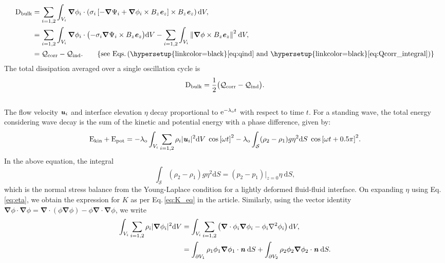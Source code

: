 \documentclass[aps,prfluids,reprint,superscriptaddress]{revtex4-2}
\newcommand{\h}[1]{\textbf{\textit{#1}}}
\newcommand{\ii}[1]{\text{#1}}
\newcommand{\nn}{\nonumber}
\newcommand{\mref}[1]{{\hypersetup{linkcolor=black}\ref{#1}}}
\newcommand{\meqref}[1]{{\hypersetup{linkcolor=black}\eqref{#1}}}
\numberwithin{equation}{section}
\begin{document}
\begin{align}
	\nn
	\ii D_{\rm bulk} &= \sum_{i=1,2} \int_{V_i} 
	\bm\nabla\phi_i \cdot 
	\left( \sigma_i\left[ -\bm\nabla\Psi_i + \bm\nabla\phi_i \times B_z\h e_z \right]
	\times B_z\h e_z \right) \mathrm dV,
	\\
	\nn
	&= \sum_{i=1,2} \int_{V_i}  \bm\nabla\phi_i \cdot \bigl(
	-\sigma_i\bm\nabla\Psi_i \times B_z\h e_z \bigr) \mathrm dV
	- 
	\sum_{i=1,2} \int_{V_i} \norm{\bm\nabla\phi \times B_z\h e_z}^2 \: \mathrm dV,
	\\
	& = \mathcal{Q}_{\rm corr} - \mathcal{Q}_{\rm ind}. 
	\qquad \{ \ii{see Eqs.\,(\mref{eq:qind} and \mref{eq:Qcorr_integral})} \}
	\label{eq:Dbulk_result}
\end{align}
The total dissipation averaged over a single oscillation cycle is
\begin{equation}
	\ii D_{\rm bulk} = \frac{1}{2} \bigl(\mathcal{Q}_{\rm corr} - \mathcal{Q}_{\rm ind} \bigr).
	\label{eq:Dbulk_avg}
\end{equation}
\\
\indent The flow velocity $\h u_i$ and interface elevation $\eta$ decay proportional to $\ii e^{-\lambda_{\rm o}t}$ with respect to time $t$. For a standing wave, the total energy considering wave decay is the sum of the kinetic and potential energy with a phase difference, given by:
\begin{equation}
	\ii E_{\rm kin} + \ii E_{\rm pot} = 
	-\lambda_{\rm o} \int_{V_i}\sum_{i=1,2} \rho_i |\h u_i|^2 \mathrm dV
	\; \cos{[ \omega t ]}^2 
	-\lambda_{\rm o} \int_{\mathcal{S}}
	(\rho_2-\rho_1)g\eta^2 \mathrm dS
	\; \cos{[ \omega t  + 0.5\pi]}^2 .
	\label{eq:kin+pot_integrals}
\end{equation}
In the above equation, the integral 
\begin{equation}
	\int_{\mathcal{S}}
	(\rho_2-\rho_1)g\eta^2 \mathrm dS =
	\left( p_2 - p_1 \right)|_{z=0} \eta \: \mathrm dS,
	\label{eq:young_laplace_integral}
\end{equation}
which is the normal stress balance from the Young-Laplace condition for a lightly deformed fluid-fluid interface. On expanding $\eta$ using Eq.\,\meqref{eq:eta}, we obtain the expression for $K$ as per Eq.\,\meqref{eq:K_eq} in the article. Similarly, using the vector identity  $\bm\nabla\phi \cdot \bm\nabla\phi = \bm\nabla\cdot(\phi \bm\nabla\phi) - \phi\bm\nabla\cdot \bm\nabla\phi$, we write
\begin{align}
	\nn
	\int_{V_i}\sum_{i=1,2} \rho_i |\bm\nabla \phi_i|^2 \mathrm dV &=
	\int_{V_i}\sum_{i=1,2} \left(
	\bm\nabla \cdot \phi_i\bm\nabla\phi_i - \phi_i\nabla^2\phi_i \right) \mathrm dV,
	\\
	&= \int_{\partial V_1} 
	\rho_1\phi_1\bm\nabla\phi_1\cdot \h n \: \mathrm dS 
	+ \int_{\partial V_2} 
	\rho_2\phi_2\bm\nabla\phi_2\cdot \h n \:\mathrm dS .
	\label{eq:grad_phi_dotn}
\end{align}
\end{document}
